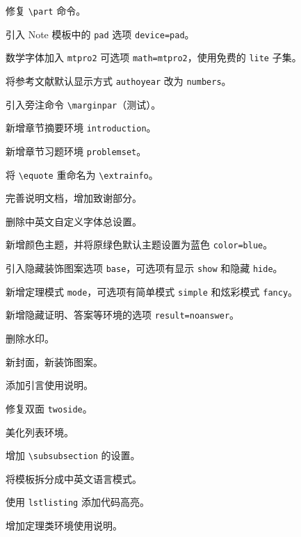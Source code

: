 \documentclass[lang=cn,newtx,10pt,scheme=chinese]{elegantbook}
\begin{document}
\begin{change}
  \item 修复 \lstinline{\part} 命令。
  \item 引入 Note 模板中的 \lstinline{pad} 选项 \lstinline{device=pad}。
  \item 数学字体加入 \lstinline{mtpro2} 可选项 \lstinline{math=mtpro2}，使用免费的 \lstinline{lite} 子集。
  \item 将参考文献默认显示方式 \lstinline{authoyear} 改为 \lstinline{numbers}。
  \item 引入旁注命令 \lstinline{\marginpar}（测试）。
  \item 新增章节摘要环境 \lstinline{introduction}。
  \item 新增章节习题环境 \lstinline{problemset}。
  \item 将 \lstinline{\equote} 重命名为 \lstinline{\extrainfo}。
  \item 完善说明文档，增加致谢部分。
\end{change}


\begin{change}
  \item 删除中英文自定义字体总设置。
  \item 新增颜色主题，并将原绿色默认主题设置为蓝色 \lstinline{color=blue}。
  \item 引入隐藏装饰图案选项 \lstinline{base}，可选项有显示 \lstinline{show} 和隐藏 \lstinline{hide}。
  \item 新增定理模式 \lstinline{mode}，可选项有简单模式 \lstinline{simple} 和炫彩模式 \lstinline{fancy}。
  \item 新增隐藏证明、答案等环境的选项 \lstinline{result=noanswer}。
\end{change}


\begin{change}
  \item 删除水印。
  \item 新封面，新装饰图案。
  \item 添加引言使用说明。
  \item 修复双面 \lstinline{twoside}。
  \item 美化列表环境。
  \item 增加 \lstinline{\subsubsection} 的设置。
  \item 将模板拆分成中英文语言模式。
  \item 使用 \lstinline{lstlisting} 添加代码高亮。
  \item 增加定理类环境使用说明。
\end{change}
\end{document}
